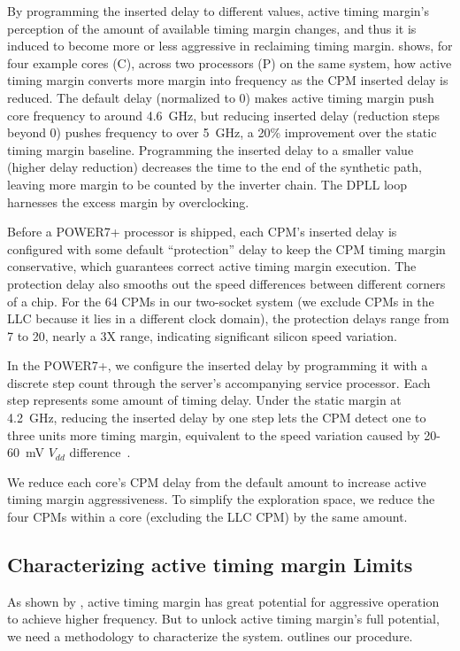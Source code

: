 By programming the inserted delay to different values, active timing margin's perception of the amount of available timing margin changes, and thus it is induced to become more or less aggressive in reclaiming timing margin.  shows, for four example cores (C), across two processors (P) on the same system, how active timing margin converts more margin into frequency as the CPM inserted delay is reduced. The default delay (normalized to 0) makes active timing margin push core frequency to around 4.6~GHz, but reducing inserted delay (reduction steps beyond 0) pushes frequency to over 5~GHz, a 20\% improvement over the static timing margin baseline. Programming the inserted delay to a smaller value (higher delay reduction) decreases the time to the end of the synthetic path, leaving more margin to be counted by the inverter chain. The DPLL loop harnesses the excess margin by overclocking.

Before a POWER7+ processor is shipped, each CPM's inserted delay is configured with some default ``protection'' delay to keep the CPM timing margin conservative, which guarantees correct active timing margin execution. The protection delay also smooths out the speed differences between different corners of a chip. For the 64 CPMs in our two-socket system (we exclude CPMs in the LLC because it lies in a different clock domain), the protection delays range from 7 to 20, nearly a 3X range, indicating significant silicon speed variation.

In the POWER7+, we configure the inserted delay by programming it with a discrete step count through the server's accompanying service processor. Each step represents some amount of timing delay. Under the static margin at 4.2~GHz, reducing the inserted delay by one step lets the CPM detect one to three units more timing margin, equivalent to the speed variation caused by 20-60~mV $V_{dd}$ difference~\cite{drake2013single,zu2015adaptive}.

We reduce each core's CPM delay from the default amount to increase active timing margin aggressiveness. To simplify the exploration space, we reduce the four CPMs within a core (excluding the LLC CPM) by the same amount.

\subsection{Characterizing active timing margin Limits}
\label{sec:process:methodology}

As shown by , active timing margin has great potential for aggressive operation to achieve higher frequency. But to unlock active timing margin's full potential, we need a methodology to characterize the system.  outlines our procedure. 

